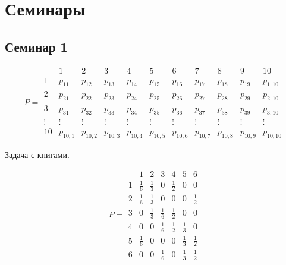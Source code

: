 \section{Семинары}

\subsection{Семинар 1}



\[
	P =
	\begin{array}{c|cccccccccc}
		       & 1        & 2        & 3        & 4        & 5        & 6        & 7        & 8        & 9        & 10        \\ \hline
		1      & p_{11}   & p_{12}   & p_{13}   & p_{14}   & p_{15}   & p_{16}   & p_{17}   & p_{18}   & p_{19}   & p_{1,10}  \\
		2      & p_{21}   & p_{22}   & p_{23}   & p_{24}   & p_{25}   & p_{26}   & p_{27}   & p_{28}   & p_{29}   & p_{2,10}  \\
		3      & p_{31}   & p_{32}   & p_{33}   & p_{34}   & p_{35}   & p_{36}   & p_{37}   & p_{38}   & p_{39}   & p_{3,10}  \\
		\vdots & \vdots   & \vdots   & \vdots   & \vdots   & \vdots   & \vdots   & \vdots   & \vdots   & \vdots   & \vdots    \\
		10     & p_{10,1} & p_{10,2} & p_{10,3} & p_{10,4} & p_{10,5} & p_{10,6} & p_{10,7} & p_{10,8} & p_{10,9} & p_{10,10}
	\end{array}
\]



Задача с книгами.

\[
	P =
	\begin{array}{c|cccccc}
		  & 1            & 2            & 3            & 4            & 5            & 6            \\ \hline
		1 & \tfrac{1}{6} & \tfrac{1}{3} & 0            & \tfrac{1}{2} & 0            & 0            \\
		2 & \tfrac{1}{6} & \tfrac{1}{3} & 0            & 0            & 0            & \tfrac{1}{2} \\
		3 & 0            & \tfrac{1}{3} & \tfrac{1}{6} & \tfrac{1}{2} & 0            & 0            \\
		4 & 0            & 0            & \tfrac{1}{6} & \tfrac{1}{2} & \tfrac{1}{3} & 0            \\
		5 & \tfrac{1}{6} & 0            & 0            & 0            & \tfrac{1}{3} & \tfrac{1}{2} \\
		6 & 0            & 0            & \tfrac{1}{6} & 0            & \tfrac{1}{3} & \tfrac{1}{2}
	\end{array}
\]
